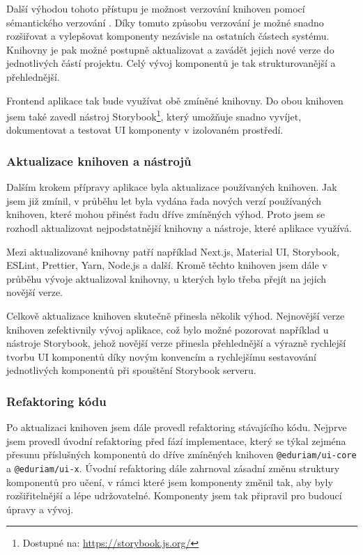 Další výhodou tohoto přístupu je možnost verzování knihoven pomocí sémantického verzování \cite{SemVer}. Díky tomuto způsobu verzování je možné snadno rozšiřovat a vylepšovat komponenty nezávisle na ostatních částech systému. Knihovny je pak možné postupně aktualizovat a zavádět jejich nové verze do jednotlivých částí projektu. Celý vývoj komponentů je tak strukturovanější a přehlednější.

Frontend aplikace tak bude využívat obě zmíněné knihovny. Do obou knihoven jsem také zavedl nástroj Storybook\footnote{Dostupné na: \href{https://storybook.js.org/}{https://storybook.js.org/}}, který umožňuje snadno vyvíjet, dokumentovat a testovat UI komponenty v izolovaném prostředí.

\subsubsection{Aktualizace knihoven a nástrojů}

Dalším krokem přípravy aplikace byla aktualizace používaných knihoven. Jak jsem již zmínil, v průběhu let byla vydána řada nových verzí používaných knihoven, které mohou přinést řadu dříve zmíněných výhod. Proto jsem se rozhodl aktualizovat nejpodstatnější knihovny a nástroje, které aplikace využívá.

Mezi aktualizované knihovny patří například Next.js, Material UI, Storybook, ESLint, Prettier, Yarn, Node.js a další. Kromě těchto knihoven jsem dále v průběhu vývoje aktualizoval knihovny, u kterých bylo třeba přejít na jejich novější verze.

Celkově aktualizace knihoven skutečně přinesla několik výhod. Nejnovější verze knihoven zefektivnily vývoj aplikace, což bylo možné pozorovat například u nástroje Storybook, jehož novější verze přinesla přehlednější a výrazně rychlejší tvorbu UI komponentů díky novým konvencím a rychlejšímu sestavování jednotlivých komponentů při spouštění Storybook serveru.

\subsubsection{Refaktoring kódu}

Po aktualizaci knihoven jsem dále provedl refaktoring stávajícího kódu. Nejprve jsem provedl úvodní refaktoring před fází implementace, který se týkal zejména přesunu příslušných komponentů do dříve zmíněných knihoven \texttt{@eduriam/ui-core} a \texttt{@eduriam/ui-x}. Úvodní refaktoring dále zahrnoval zásadní změnu struktury komponentů pro učení, v rámci které jsem komponenty změnil tak, aby byly rozšiřitelnější a lépe udržovatelné. Komponenty jsem tak připravil pro budoucí úpravy a vývoj.

